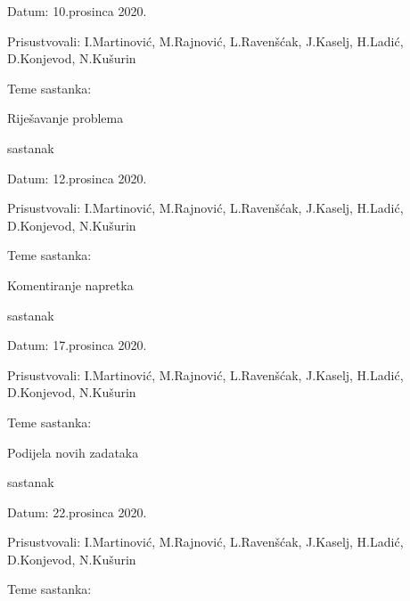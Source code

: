 \begin{packed_enum}
				\item[] \begin{packed_item}
				\item Datum: 10.prosinca 2020.
				\item Prisustvovali: I.Martinović, M.Rajnović, L.Ravenšćak, J.Kaselj, H.Ladić, D.Konjevod, N.Kušurin
				\item Teme sastanka: 
				\begin{packed_item}
					\item   Riješavanje problema
				\end{packed_item}
			\end{packed_item}
		\item sastanak
						\item[] \begin{packed_item}
			\item Datum: 12.prosinca 2020.
			\item Prisustvovali: I.Martinović, M.Rajnović, L.Ravenšćak, J.Kaselj, H.Ladić, D.Konjevod, N.Kušurin
			\item Teme sastanka: 
			\begin{packed_item}
				\item   Komentiranje napretka
			\end{packed_item}
		\end{packed_item}
			\item sastanak
							\item[] \begin{packed_item}
				\item Datum: 17.prosinca 2020.
				\item Prisustvovali: I.Martinović, M.Rajnović, L.Ravenšćak, J.Kaselj, H.Ladić, D.Konjevod, N.Kušurin
				\item Teme sastanka: 
				\begin{packed_item}
					\item   Podijela novih zadataka
				\end{packed_item}
			\end{packed_item}
		\item sastanak
						\item[] \begin{packed_item}
			\item Datum: 22.prosinca 2020.
			\item Prisustvovali: I.Martinović, M.Rajnović, L.Ravenšćak, J.Kaselj, H.Ladić, D.Konjevod, N.Kušurin
			\item Teme sastanka: 
			\begin{packed_item}

\end{packed_item}
\end{packed_item}
\end{packed_enum}
